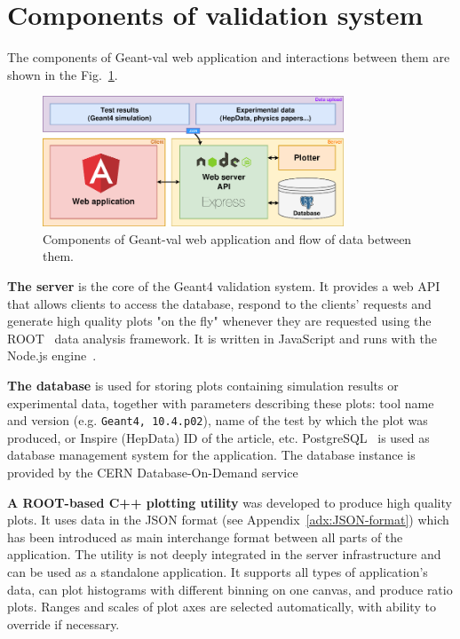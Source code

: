 \section{Components of validation system}
\label{sec-webapplication}

The components of \textsf{Geant-val} web application and interactions between them are shown in the Fig.~\ref{fig:dataflow}.

\begin{figure}[h]
    \centering
    \includegraphics[width=0.8\textwidth,clip]{schema.png}
    \caption{Components of \textsf{Geant-val} web application and flow of data between them.}
    \label{fig:dataflow}
\end{figure}

\textbf{The server} is the core of the Geant4 validation system. It provides a web API that allows clients to access the database, respond to the clients' requests and generate high quality plots "on the fly" whenever they are requested using the ROOT~\cite{ROOT} data analysis framework.
It is written in JavaScript and runs with the Node.js engine~\cite{NodeJS}. 

\textbf{The database} is used for storing plots containing simulation results or experimental data, together with parameters describing these plots: tool name and version (e.g. \texttt{Geant4, 10.4.p02}), name of the test by which the plot was produced, or Inspire (HepData) ID of the article, etc. PostgreSQL~\cite{Postgre} is used as database management system for the application. The database instance is provided by the CERN Database-On-Demand service  %


\textbf{A ROOT-based C++ plotting utility} was developed to produce high quality plots. It uses data in the JSON format (see Appendix~\ref{adx:JSON-format}) which has been introduced as main interchange format between all parts of the application. The utility is not deeply integrated in the server infrastructure and can be used as a standalone application. It supports all types of application's data, can plot histograms with different binning on one canvas, and produce ratio plots. Ranges and scales of plot axes are selected automatically, with ability to override if necessary. %

